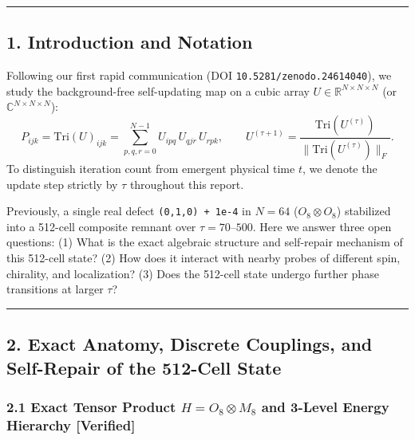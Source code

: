 \documentclass[
  a4paper,
]{article}
\begin{document}
\begin{center}\rule{0.5\linewidth}{0.5pt}\end{center}

\subsection{1. Introduction and
Notation}\label{introduction-and-notation}

Following our first rapid communication (DOI
\texttt{10.5281/\allowbreak{}zenodo.24614040}), we study the background-free
self-updating map on a cubic array
\(U \in \mathbb{R}^{N\times N\times N}\) (or
\(\mathbb{C}^{N\times N\times N}\)):
\[P_{ijk} = \mathrm{Tri}(U)_{ijk} = \sum_{p,q,r=0}^{N-1} U_{ipq}\, U_{qjr}\, U_{rpk}, \qquad U^{(\tau+1)} = \frac{\mathrm{Tri}(U^{(\tau)})}{\|\mathrm{Tri}(U^{(\tau)})\|_F}.\]
To distinguish iteration count from emergent physical time \(t\), we
denote the update step strictly by \textbf{\(\tau\)} throughout this
report.

Previously, a single real defect \texttt{(0,1,0)\ +\ 1e-4} in \(N = 64\)
(\(O_8 \otimes O_8\)) stabilized into a 512-cell composite remnant over
\(\tau = 70\text{--}500\). Here we answer three open questions: (1) What
is the exact algebraic structure and self-repair mechanism of this
512-cell state? (2) How does it interact with nearby probes of different
spin, chirality, and localization? (3) Does the 512-cell state undergo
further phase transitions at larger \(\tau\)?

\begin{center}\rule{0.5\linewidth}{0.5pt}\end{center}

\subsection{2. Exact Anatomy, Discrete Couplings, and Self-Repair of the
512-Cell
State}\label{exact-anatomy-discrete-couplings-and-self-repair-of-the-512-cell-state}

\subsubsection{\texorpdfstring{2.1 Exact Tensor Product
\(H = O_8 \otimes M_8\) and 3-Level Energy Hierarchy
{[}Verified{]}}{2.1 Exact Tensor Product H = O\_8 \textbackslash otimes M\_8 and 3-Level Energy Hierarchy {[}Verified{]}}}\label{exact-tensor-product-h-o_8-otimes-m_8-and-3-level-energy-hierarchy-verified}
\end{document}
